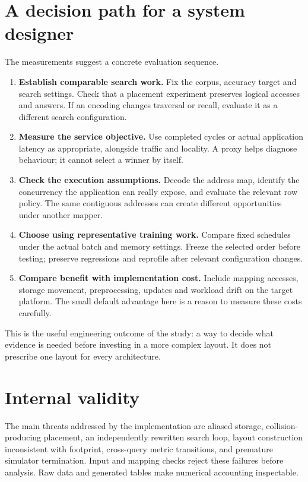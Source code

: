 \documentclass[11pt,a4paper]{report}
\begin{document}


\section{A decision path for a system designer}
The measurements suggest a concrete evaluation sequence.
\begin{enumerate}
\item \textbf{Establish comparable search work.} Fix the corpus, accuracy target and search settings. Check that a placement experiment preserves logical accesses and answers. If an encoding changes traversal or recall, evaluate it as a different search configuration.
\item \textbf{Measure the service objective.} Use completed cycles or actual application latency as appropriate, alongside traffic and locality. A proxy helps diagnose behaviour; it cannot select a winner by itself.
\item \textbf{Check the execution assumptions.} Decode the address map, identify the concurrency the application can really expose, and evaluate the relevant row policy. The same contiguous addresses can create different opportunities under another mapper.
\item \textbf{Choose using representative training work.} Compare fixed schedules under the actual batch and memory settings. Freeze the selected order before testing; preserve regressions and reprofile after relevant configuration changes.
\item \textbf{Compare benefit with implementation cost.} Include mapping accesses, storage movement, preprocessing, updates and workload drift on the target platform. The small default advantage here is a reason to measure these costs carefully.
\end{enumerate}
This is the useful engineering outcome of the study: a way to decide what evidence is needed before investing in a more complex layout. It does not prescribe one layout for every architecture.

\section{Internal validity}
The main threats addressed by the implementation are aliased storage, collision-producing placement, an independently rewritten search loop, layout construction inconsistent with footprint, cross-query metric transitions, and premature simulator termination. Input and mapping checks reject these failures before analysis. Raw data and generated tables make numerical accounting inspectable.
\end{document}
